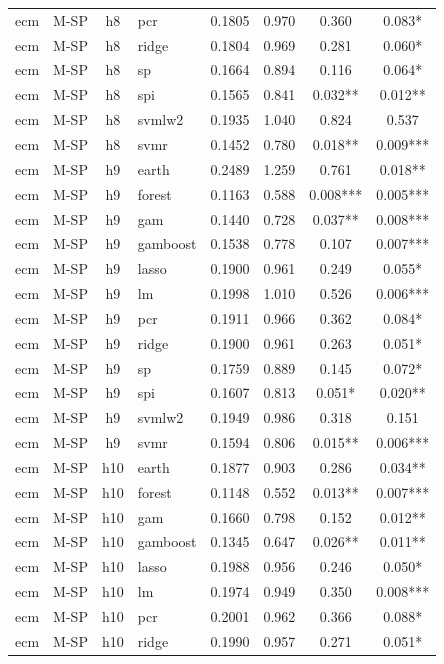 \begin{ThreePartTable}
\begin{longtable}[t]{llclcccc}
ecm & M-SP & h8 & pcr & 0.1805 & 0.970 & 0.360 & 0.083*\\
ecm & M-SP & h8 & ridge & 0.1804 & 0.969 & 0.281 & 0.060*\\
ecm & M-SP & h8 & sp & 0.1664 & 0.894 & 0.116 & 0.064*\\
ecm & M-SP & h8 & spi & 0.1565 & 0.841 & 0.032** & 0.012**\\
ecm & M-SP & h8 & svmlw2 & 0.1935 & 1.040 & 0.824 & 0.537\\
ecm & M-SP & h8 & svmr & 0.1452 & 0.780 & 0.018** & 0.009***\\
\addlinespace
ecm & M-SP & h9 & earth & 0.2489 & 1.259 & 0.761 & 0.018**\\
ecm & M-SP & h9 & forest & 0.1163 & 0.588 & 0.008*** & 0.005***\\
ecm & M-SP & h9 & gam & 0.1440 & 0.728 & 0.037** & 0.008***\\
ecm & M-SP & h9 & gamboost & 0.1538 & 0.778 & 0.107 & 0.007***\\
ecm & M-SP & h9 & lasso & 0.1900 & 0.961 & 0.249 & 0.055*\\
ecm & M-SP & h9 & lm & 0.1998 & 1.010 & 0.526 & 0.006***\\
ecm & M-SP & h9 & pcr & 0.1911 & 0.966 & 0.362 & 0.084*\\
ecm & M-SP & h9 & ridge & 0.1900 & 0.961 & 0.263 & 0.051*\\
ecm & M-SP & h9 & sp & 0.1759 & 0.889 & 0.145 & 0.072*\\
ecm & M-SP & h9 & spi & 0.1607 & 0.813 & 0.051* & 0.020**\\
ecm & M-SP & h9 & svmlw2 & 0.1949 & 0.986 & 0.318 & 0.151\\
ecm & M-SP & h9 & svmr & 0.1594 & 0.806 & 0.015** & 0.006***\\
\addlinespace
ecm & M-SP & h10 & earth & 0.1877 & 0.903 & 0.286 & 0.034**\\
ecm & M-SP & h10 & forest & 0.1148 & 0.552 & 0.013** & 0.007***\\
ecm & M-SP & h10 & gam & 0.1660 & 0.798 & 0.152 & 0.012**\\
ecm & M-SP & h10 & gamboost & 0.1345 & 0.647 & 0.026** & 0.011**\\
ecm & M-SP & h10 & lasso & 0.1988 & 0.956 & 0.246 & 0.050*\\
ecm & M-SP & h10 & lm & 0.1974 & 0.949 & 0.350 & 0.008***\\
ecm & M-SP & h10 & pcr & 0.2001 & 0.962 & 0.366 & 0.088*\\
ecm & M-SP & h10 & ridge & 0.1990 & 0.957 & 0.271 & 0.051*\\

\end{longtable}
\end{ThreePartTable}
